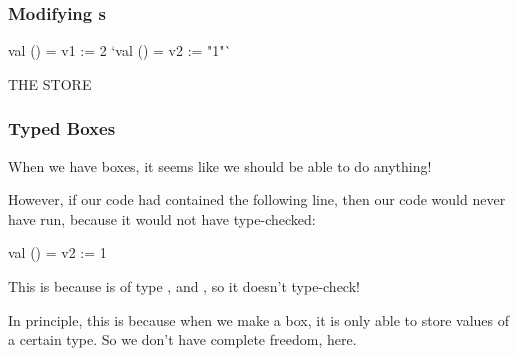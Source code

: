 \documentclass[aspectratio=169]{beamer}
\begin{document}
\begin{frame}[fragile]
  \frametitle{Modifying s}

  \begin{center}
    \begin{minipage}[t][2.5in][t]{0.55\textwidth}
      \vspace{\fill}
      \begin{codeblock}
        val () = v1 := 2
        `val () = v2 := "1"`
      \end{codeblock}
      \vspace{\fill}
    \end{minipage}
    \hfill\vline\hfill
    \begin{minipage}[t][2.5in][t]{0.35\textwidth}
      \centering
      {\hspace{-20pt}\color{gray} \large THE STORE}

      \vspace{\fill}
      \vspace{\fill}
    \end{minipage}
  \end{center}
\end{frame}

\begin{frame}[fragile]
  \frametitle{Typed Boxes}

  When we have boxes, it seems like we should be able to do anything!

  \pause
  \vspace{\fill}

  However, if our code had contained the following line, then our code
  would never have run, because it would not have type-checked:
  \begin{codeblock}
    val () = v2 := 1
  \end{codeblock}

  \pause
  \vspace{\fill}

  This is because  is of type , and
  , so it doesn't type-check!

  \pause
  \vspace{\fill}

  In principle, this is because when we make a box, it is only able to store
  values of a certain type. So we don't have complete freedom, here.
\end{frame}
\end{document}
